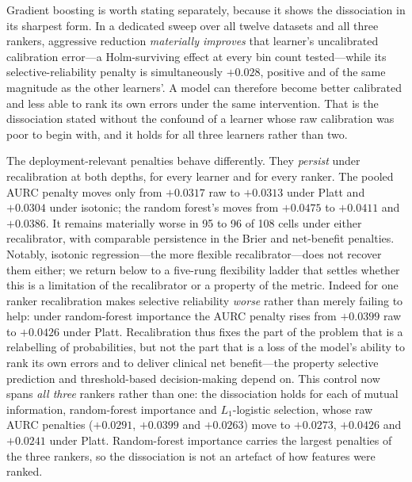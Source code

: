 \documentclass[fleqn,10pt]{wlscirep}
\newcommand{\result}[1]{#1}
\begin{document}
Gradient boosting is worth stating separately, because it shows the dissociation in its sharpest
form. In a dedicated sweep over all twelve datasets and all three rankers, aggressive reduction
\emph{materially improves} that learner's uncalibrated calibration error---a Holm-surviving effect at
every bin count tested---while its selective-reliability penalty is simultaneously
\result{$+0.028$}, positive and of the same magnitude as the other learners'. A model can therefore
become better calibrated and less able to rank its own errors under the same intervention. That is
the dissociation stated without the confound of a learner whose raw calibration was poor to begin
with, and it holds for all three learners rather than two.

The deployment-relevant penalties behave differently. They \emph{persist} under recalibration at
both depths, for every learner and for every ranker. The pooled AURC penalty moves only from
\result{$+0.0317$} raw to \result{$+0.0313$} under Platt and \result{$+0.0304$} under isotonic; the
random forest's moves from \result{$+0.0475$} to \result{$+0.0411$} and \result{$+0.0386$}. It remains
materially worse in \result{95} to \result{96} of \result{108} cells under either recalibrator, with
comparable persistence in the Brier and net-benefit penalties. Notably,
isotonic regression---the more flexible recalibrator---does not recover them either; we return below to
a five-rung flexibility ladder that settles whether this is a limitation of the recalibrator or a
property of the metric. Indeed for one ranker
recalibration makes selective reliability \emph{worse} rather than merely failing to help: under
random-forest importance the AURC penalty rises from \result{$+0.0399$} raw to \result{$+0.0426$}
under Platt. Recalibration thus fixes the part of the problem that is a
relabelling of probabilities, but not the part that is a loss of the model's ability to rank its own
errors and to deliver clinical net benefit---the property selective prediction and threshold-based
decision-making depend on. This control now spans \emph{all three} rankers rather than one: the
dissociation holds for each of mutual information, random-forest importance and $L_1$-logistic
selection, whose raw AURC penalties (\result{$+0.0291$}, \result{$+0.0399$} and \result{$+0.0263$})
move to \result{$+0.0273$}, \result{$+0.0426$} and \result{$+0.0241$} under Platt. Random-forest
importance carries the largest penalties of the three rankers, so the dissociation is not an
artefact of how features were ranked.
\end{document}

